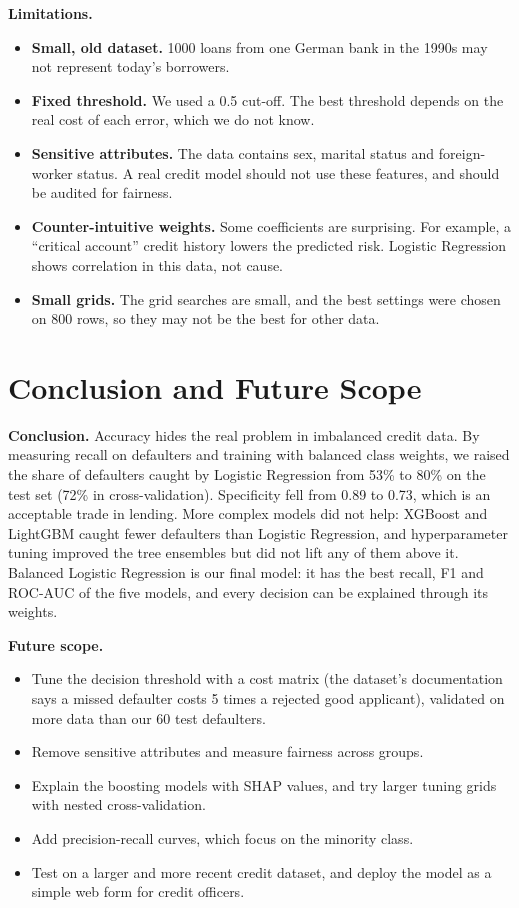\documentclass[11pt,a4paper]{article}
\begin{document}
\textbf{Limitations.}
\begin{itemize}
  \item \textbf{Small, old dataset.} 1000 loans from one German bank in the 1990s may not represent today's borrowers.
  \item \textbf{Fixed threshold.} We used a 0.5 cut-off. The best threshold depends on the real cost of each error, which we do not know.
  \item \textbf{Sensitive attributes.} The data contains sex, marital status and foreign-worker status. A real credit model should not use these features, and should be audited for fairness.
  \item \textbf{Counter-intuitive weights.} Some coefficients are surprising. For example, a ``critical account'' credit history lowers the predicted risk. Logistic Regression shows correlation in this data, not cause.
  \item \textbf{Small grids.} The grid searches are small, and the best settings were chosen on 800 rows, so they may not be the best for other data.
\end{itemize}

\section{Conclusion and Future Scope}

\textbf{Conclusion.} Accuracy hides the real problem in imbalanced credit data. By measuring recall on defaulters and training with balanced class weights, we raised the share of defaulters caught by Logistic Regression from 53\% to 80\% on the test set (72\% in cross-validation). Specificity fell from 0.89 to 0.73, which is an acceptable trade in lending. More complex models did not help: XGBoost and LightGBM caught fewer defaulters than Logistic Regression, and hyperparameter tuning improved the tree ensembles but did not lift any of them above it. Balanced Logistic Regression is our final model: it has the best recall, F1 and ROC-AUC of the five models, and every decision can be explained through its weights.

\textbf{Future scope.}
\begin{itemize}
  \item Tune the decision threshold with a cost matrix (the dataset's documentation says a missed defaulter costs 5 times a rejected good applicant), validated on more data than our 60 test defaulters.
  \item Remove sensitive attributes and measure fairness across groups.
  \item Explain the boosting models with SHAP values, and try larger tuning grids with nested cross-validation.
  \item Add precision-recall curves, which focus on the minority class.
  \item Test on a larger and more recent credit dataset, and deploy the model as a simple web form for credit officers.
\end{itemize}
\end{document}
